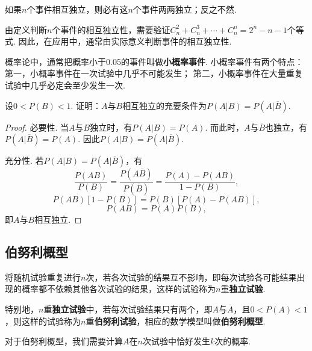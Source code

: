 \begin{theorem}
如果\(n\)个事件相互独立，则必有这\(n\)个事件两两独立；反之不然.
\end{theorem}

由定义判断\(n\)个事件的相互独立性，需要验证\(C_n^2+C_n^3+\dotsb+C_n^n=2^n-n-1\)个等式.
因此，在应用中，通常由实际意义判断事件的相互独立性.

概率论中，通常把概率小于0.05的事件叫做\textbf{小概率事件}.
小概率事件有两个特点：
第一，小概率事件在一次试验中几乎不可能发生；
第二，小概率事件在大量重复试验中几乎必定会至少发生一次.

\begin{example}
设\(0<P(B)<1\).
证明：\(A\)与\(B\)相互独立的充要条件为\(P(A \vert B) = P(A \vert \overline{B})\).
\begin{proof}
必要性.
当\(A\)与\(B\)独立时，有\(P(A \vert B) = P(A)\).
而此时，\(A\)与\(\overline{B}\)也独立，有\(P(A \vert \overline{B}) = P(A)\).
因此\(P(A \vert B) = P(A \vert \overline{B})\).

充分性.
若\(P(A \vert B) = P(A \vert \overline{B})\)，有\[
\frac{P(AB)}{P(B)}
= \frac{P(A\overline{B})}{P(\overline{B})}
= \frac{P(A)-P(AB)}{1-P(B)},
\]\[
P(AB) [1-P(B)] = P(B) [P(A)-P(AB)],
\]\[
P(AB) = P(A) P(B),
\]即\(A\)与\(B\)相互独立.
\end{proof}
\end{example}

\subsection{伯努利概型}
\begin{definition}
将随机试验重复进行\(n\)次，若各次试验的结果互不影响，即每次试验各可能结果出现的概率都不依赖其他各次试验的结果，这样的试验称为\(n\)重\textbf{独立试验}.

特别地，\(n\)重\textbf{独立试验}中，若每次试验结果只有两个，即\(A\)与\(\overline{A}\)，且\(0 < P(A) < 1\)，则这样的试验称为\(n\)重\textbf{伯努利试验}，相应的数学模型叫做\textbf{伯努利概型}.
\end{definition}

对于伯努利概型，我们需要计算\(A\)在\(n\)次试验中恰好发生\(k\)次的概率.

